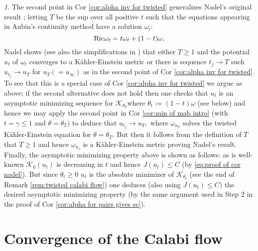 \documentclass[11pt,oneside,english]{amsart}
\numberwithin{equation}{section}
\numberwithin{figure}{section}
\theoremstyle{plain}
\theoremstyle{plain}
\theoremstyle{plain}
\theoremstyle{plain}
\theoremstyle{remark}
\newtheorem{rem}[thm]{\protect\remarkname}
\theoremstyle{definition}
\providecommand{\remarkname}{Remark}
\begin{document}
\begin{rem}
\label{rem:nadel seq}The second point in Cor \ref{cor:alpha inv for twisted}
generalizes Nadel's original result \cite{na}; letting $T$ be the
sup over all positive $t$ such that the equations appearing in Aubin's
continuity method have a solution $\omega_{t}:$ 
\begin{equation}
\mbox{Ric\ensuremath{\omega_{t}=t\omega_{t}+(1-t)\omega},}\label{eq:cont equation}
\end{equation}
Nadel shows (see also the simplifications in \cite{d-j}) that either
$T\ge1$ and the potential $u_{t}$ of $\omega_{t}$ converges to
a Kähler-Einstein metric or there is sequence $t_{j}\rightarrow T$
such $u_{t_{j}}\rightarrow u_{T}$ for $u_{T}(=u_{\infty})$ as in
the second point of Cor \ref{cor:alpha inv for twisted}. To see that
this is a special case of Cor \ref{cor:alpha inv for twisted} we
argue as above; if the second alternative does not hold then one checks
that $u_{t}$ is an asymptotic minimizing sequence for $\mathcal{K}_{\theta_{T}}$where
$\theta_{t}:=(1-t)\omega$ (see below) and hence we may apply the
second point in Cor \ref{cor:min of mab intro} (with $t=\gamma\leq1$
and $\theta=\theta_{T})$ to deduce that $u_{t_{j}}\rightarrow u_{T},$
where $\omega_{u_{T}}$ solves the twisted Kähler-Einstein equation
for $\theta=\theta_{T}.$ But then it follows from the definition
of $T$ that $T\geq1$ and hence $\omega_{u_{1}}$ is a Kähler-Einstein
metric proving Nadel's result. Finally, the asymptotic minimizing
property above is shown as follows: as is well-known $\mathcal{K}_{0}(u_{t})$
is decreasing in $t$ and hence $J(u_{t})\leq C$ (by \ref{eq:proof of cor nadel}).
But since $\theta_{t}\geq0$ $u_{t}$ is the absolute minimizer of
$\mathcal{K}_{\theta_{t}}$ (see the end of Remark \ref{rem:twisted calabi flow})
one deduces (also using $J(u_{t})\leq C)$ the desired asymptotic
minimizing property (by the same argument used in Step 2 in the proof
of Cor \ref{cor:alpha for pairs gives ec}). 
\end{rem}

\section{\label{sec:Convergence-of-the-cal}Convergence of the Calabi flow }
\end{document}
